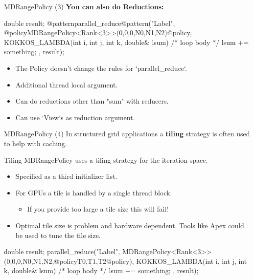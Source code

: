 \begin{frame}[fragile]{MDRangePolicy (3)}
   \textbf{You can also do Reductions:}

  \begin{code}[linebackgroundcolor={
        \btLstHL<1->{5-6}{bodyColor}
      },
      frame=single
    ]
double result;
@patternparallel_reduce@pattern("Label", 
  @policyMDRangePolicy<Rank<3>>({0,0,0},{N0,N1,N2})@policy, 
  KOKKOS_LAMBDA(int i, int j, int k, double& lsum) {
     /* loop body */
  lsum += something;
}, result);
  \end{code}

\begin{itemize}
   \item<2-> The Policy doesn't change the rules for `parallel\_reduce`.
   \item<3-> Additional thread local argument.
   \item<4-> Can do reductions other than "sum" with reducers.
   \item<5-> Can use `View`s as reduction argument.
\end{itemize}
\end{frame}

\begin{frame}[fragile]{MDRangePolicy (4)}
   In structured grid applications a \textbf{tiling} strategy is often used to help with caching.

	\begin{block}{Tiling}
		MDRangePolicy uses a tiling strategy for the iteration space.
	\end{block}

	\begin{itemize}
		\item Specified as a third initializer list.
		\item For GPUs a tile is handled by a single thread block.
			\begin{itemize}
				\item If you provide too large a tile size this will fail!
			\end{itemize}
		\item Optimal tile size is problem and hardware dependent. Tools like Apex could be used to tune the tile size.
	\end{itemize}

\begin{code}[keywords={}]
double result;
parallel_reduce("Label", 
  MDRangePolicy<Rank<3>>({0,0,0},{N0,N1,N2},@policy{T0,T1,T2}@policy), 
  KOKKOS_LAMBDA(int i, int j, int k, double& lsum) {
     /* loop body */
  lsum += something;
}, result);
  \end{code}

\end{frame}


